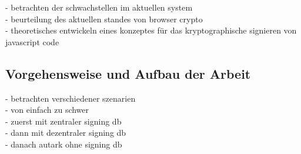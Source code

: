 - betrachten der schwachstellen im aktuellen system\\
- beurteilung des aktuellen standes von browser crypto \\
- theoretisches entwickeln eines konzeptes für das kryptographische signieren von javascript code \\

\subsection{Vorgehensweise und Aufbau der Arbeit}

- betrachten verschiedener szenarien \\
- von einfach zu schwer \\
- zuerst mit zentraler signing db \\
- dann mit dezentraler signing db \\
- danach autark ohne signing db

\newpage
